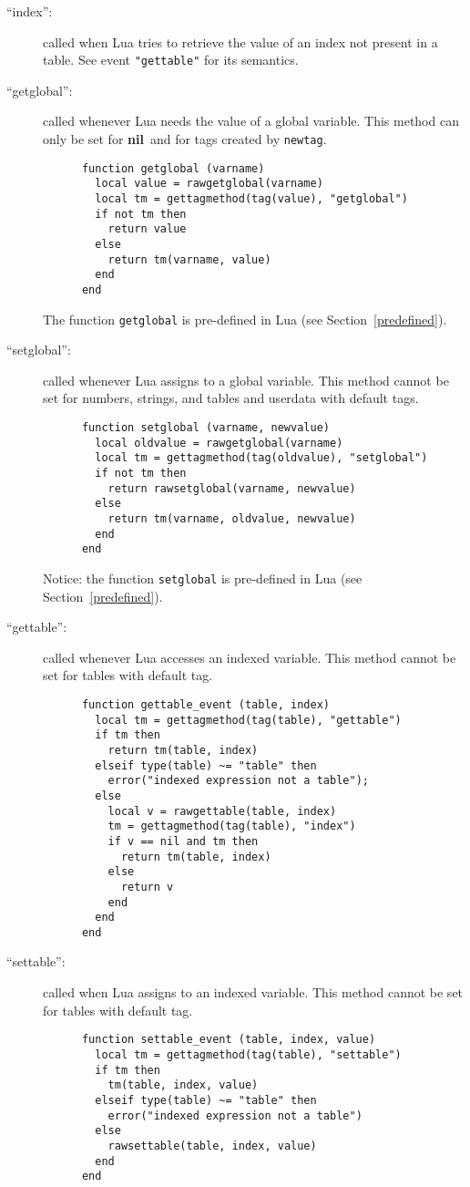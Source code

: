 \documentclass[11pt]{article}
\newcommand{\See}[1]{Section~\ref{#1}}
\newcommand{\see}[1]{(see \See{#1})}
\newcommand{\nil}{{\bf nil}}
\begin{document}
\begin{description}
\item[``index'':]
called when Lua tries to retrieve the value of an index
not present in a table.
See event \verb|"gettable"| for its semantics.

\item[``getglobal'':]
called whenever Lua needs the value of a global variable.
This method can only be set for \nil\ and for tags
created by \verb|newtag|.
\begin{verbatim}
      function getglobal (varname)
        local value = rawgetglobal(varname)
        local tm = gettagmethod(tag(value), "getglobal")
        if not tm then
          return value
        else
          return tm(varname, value)
        end
      end
\end{verbatim}
The function \verb|getglobal| is pre-defined in Lua \see{predefined}.

\item[``setglobal'':]
called whenever Lua assigns to a global variable.
This method cannot be set for numbers, strings, and tables and
userdata with default tags.
\begin{verbatim}
      function setglobal (varname, newvalue)
        local oldvalue = rawgetglobal(varname)
        local tm = gettagmethod(tag(oldvalue), "setglobal")
        if not tm then
          return rawsetglobal(varname, newvalue)
        else
          return tm(varname, oldvalue, newvalue)
        end
      end
\end{verbatim}
Notice: the function \verb|setglobal| is pre-defined in Lua \see{predefined}.

\item[``gettable'':]
called whenever Lua accesses an indexed variable.
This method cannot be set for tables with default tag.
\begin{verbatim}
      function gettable_event (table, index)
        local tm = gettagmethod(tag(table), "gettable")
        if tm then
          return tm(table, index)
        elseif type(table) ~= "table" then
          error("indexed expression not a table");
        else
          local v = rawgettable(table, index)
          tm = gettagmethod(tag(table), "index")
          if v == nil and tm then
            return tm(table, index)
          else
            return v
          end
        end
      end
\end{verbatim}

\item[``settable'':]
called when Lua assigns to an indexed variable.
This method cannot be set for tables with default tag.
\begin{verbatim}
      function settable_event (table, index, value)
        local tm = gettagmethod(tag(table), "settable")
        if tm then
          tm(table, index, value)
        elseif type(table) ~= "table" then
          error("indexed expression not a table")
        else
          rawsettable(table, index, value)
        end
      end
\end{verbatim}


\end{description}
\end{document}
